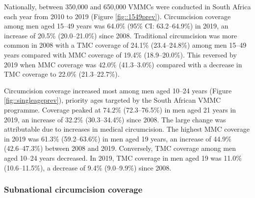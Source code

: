 \documentclass{article}
\begin{document}

Nationally, between 350,000 and 650,000 VMMCs were conducted in South Africa each year from 2010 to 2019 (Figure \ref{fig::1549prev}). Circumcision coverage among men aged 15--49 years was 64.0\% (95\% CI: 63.2--64.9\%) in 2019, an increase of 20.5\% (20.0--21.0\%) since 2008. Traditional circumcision was more common in 2008 with a TMC coverage of 24.1\% (23.4--24.8\%) among men 15--49 years compared with MMC coverage of 19.4\% (18.9--20.0\%). This reversed by 2019 when MMC coverage was  42.0\% (41.3--3.0\%) compared with a decrease in TMC coverage to 22.0\% (21.3--22.7\%).

Circumcision coverage increased most among men aged 10--24 years (Figure \ref{fig::singleageprev}), priority ages targeted by the South African VMMC programme. Coverage peaked at 74.2\% (72.3--76.5\%) in men aged 21 years in 2019, an increase of 32.2\% (30.3--34.4\%) since 2008. The large change was attributable due to increases in medical circumcision. The highest MMC coverage in 2019 was 61.3\% (59.2--63.6\%) in men aged 19 years, an increase of 44.9\% (42.6--47.3\%) between 2008 and 2019. Conversely, TMC coverage among men aged 10--24 years decreased. In 2019, TMC coverage in men aged 19 was 11.0\% (10.6--11.5\%), a decrease of 9.4\% (9.0--9.9\%) since 2008.


\subsubsection*{Subnational circumcision coverage}


\end{document}
